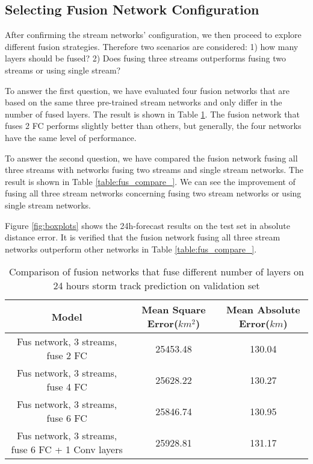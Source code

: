 \subsection{Selecting Fusion Network Configuration}
After confirming the stream networks' configuration, we then proceed to explore different fusion strategies. Therefore two scenarios are considered: 1) how many layers should be fused? 2) Does fusing three streams outperforms fusing two streams or using single stream?

To answer the first question, we have evaluated four fusion networks that are based on the same three pre-trained stream networks and only differ in the number of fused layers. The result is shown in Table \ref{table:fus_compare}. The fusion network that fuses 2 FC performs slightly better than others, but generally, the four networks have the same level of performance. 

To answer the second question, we have compared the fusion network fusing all three streams with networks fusing two streams and single stream networks. The result is shown in Table \ref{table:fus_compare_}. We can see the improvement of fusing all three stream networks concerning fusing two stream networks or using single stream networks. 

Figure \ref{fig:boxplots} shows the 24h-forecast results on the test set in absolute distance error. It is verified that the fusion network fusing all three stream networks outperform other networks in Table \ref{table:fus_compare_}. 


\begin{table}[]
	\centering
	\caption{Comparison of fusion networks that fuse different number of layers on 24 hours storm track prediction on validation set}
	\label{table:fus_compare}
	\begin{tabular}{|c|c|c|}
		\hline
		Model & Mean Square Error($km^2$) & Mean Absolute Error($km$) \\ \hline
		Fus network, 3 streams, fuse 2 FC & 25453.48 & 130.04 \\ \hline
		Fus network, 3 streams, fuse 4 FC & 25628.22 & 130.27 \\ \hline
		Fus network, 3 streams, fuse 6 FC & 25846.74 & 130.95 \\ \hline
		Fus network, 3 streams, fuse 6 FC + 1 Conv layers & 25928.81 & 131.17 \\ \hline
	\end{tabular}
\end{table}


